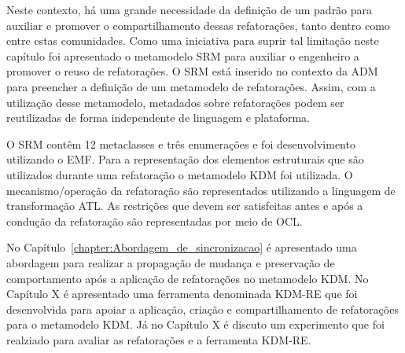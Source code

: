 Neste contexto, há uma grande necessidade da definição de um padrão para auxiliar e promover o compartilhamento dessas refatorações, tanto dentro como entre estas comunidades. Como uma iniciativa para suprir tal limitação neste capítulo foi apresentado o metamodelo SRM para auxiliar o engenheiro a promover o reuso de refatorações. O SRM está inserido no contexto da ADM para preencher a definição de um metamodelo de refatorações. Assim, com a utilização desse metamodelo, metadados sobre refatorações podem ser reutilizadas de forma independente de linguagem e plataforma.

O SRM contêm 12 metaclasses e três enumerações e foi desenvolvimento utilizando o EMF. Para a representação dos elementos estruturais que são utilizados durante uma refatoração o metamodelo KDM foi utilizada. O mecanismo/operação da refatoração são representados utilizando a linguagem de transformação ATL. As restrições que devem ser satisfeitas antes e após a condução da refatoração são representadas por meio de OCL. 

No Capítulo~\ref{chapter:Abordagem_de_sincronizacao} é apresentado uma abordagem para realizar a propagação de mudança e preservação de comportamento após a aplicação de refatorações no metamodelo KDM. No Capítulo X é apresentado uma ferramenta denominada KDM-RE que foi desenvolvida para apoiar a aplicação, criação e compartilhamento de refatorações para o metamodelo KDM. Já no Capítulo X é discuto um experimento que foi realziado para avaliar as refatorações e a ferramenta KDM-RE. 


